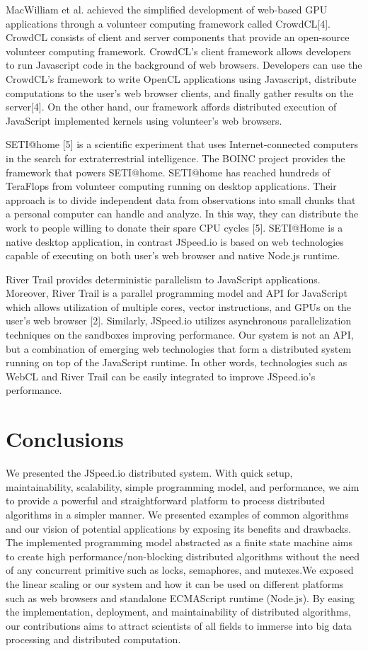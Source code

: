 \documentclass[10pt,reprint]{socc14}
\begin{document}
MacWilliam et al. achieved the simplified development of web-based GPU applications through a volunteer computing framework called CrowdCL[4]. CrowdCL consists of client and server components that provide an open-source volunteer computing framework. CrowdCL’s client framework allows developers to run Javascript code in the background of web browsers. Developers can use the CrowdCL’s framework to write OpenCL applications using Javascript, distribute computations to the user's web browser clients, and finally gather results on the server[4]. On the other hand, our framework affords distributed execution of JavaScript implemented kernels using volunteer’s  web browsers. 

SETI@home [5] is a scientific experiment that uses Internet-connected computers in the search for extraterrestrial intelligence. The BOINC project provides the framework that powers SETI@home.  SETI@home has reached hundreds of TeraFlops from volunteer computing running on desktop applications. Their approach is to divide independent data from observations into small chunks that a personal computer can handle and analyze. In this way, they can distribute the work to people willing to donate their spare CPU cycles [5]. SETI@Home is a native desktop application, in contrast JSpeed.io is based on web technologies capable of executing on both user’s web browser and native Node.js runtime. 

River Trail provides deterministic parallelism to JavaScript applications. Moreover, River Trail is a parallel programming model and API for JavaScript which allows utilization of multiple cores, vector instructions, and GPUs on the user's web browser [2]. Similarly, JSpeed.io utilizes asynchronous parallelization techniques on the sandboxes improving performance. Our system is not an API, but a combination of emerging web technologies that form a distributed system running on top of the JavaScript runtime. In other words, technologies such as WebCL and River Trail can be easily integrated to improve JSpeed.io’s performance. 


\section{Conclusions}

We presented the JSpeed.io distributed system. With quick setup, maintainability, scalability, simple programming model, and performance, we aim to provide a powerful and straightforward platform to process distributed algorithms in a simpler manner. We presented examples of common algorithms and our vision of potential applications by exposing its benefits and drawbacks. The implemented programming model abstracted as a finite state machine aims to create high performance/non-blocking distributed algorithms without the need of any concurrent primitive such as locks, semaphores, and mutexes.We exposed the linear scaling or our system and how it can be used on different platforms such as web browsers and standalone ECMAScript runtime (Node.js). By easing the implementation, deployment, and maintainability of distributed algorithms, our contributions aims to attract scientists of all fields to immerse into big data processing and distributed computation.
\end{document}
